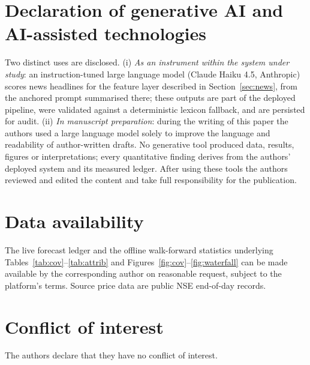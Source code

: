 \documentclass[10pt,a4paper,oneside]{article}
\theoremstyle{definition}
\theoremstyle{plain}
\begin{document}
\section*{Declaration of generative AI and AI-assisted technologies}
Two distinct uses are disclosed. (i) \emph{As an instrument within the system under
study}: an instruction-tuned large language model (Claude Haiku 4.5, Anthropic) scores
news headlines for the feature layer described in Section~\ref{sec:news}, from the
anchored prompt summarised there; these outputs are part of the deployed pipeline,
were validated against a deterministic lexicon fallback, and are persisted for audit.
(ii) \emph{In manuscript preparation}: during the writing of this paper the authors
used a large language model solely to improve the language and readability of
author-written drafts. No generative tool produced data, results, figures or
interpretations; every quantitative finding derives from the authors' deployed system
and its measured ledger. After using these tools the authors reviewed and edited the
content and take full responsibility for the publication.

\section*{Data availability}
The live forecast ledger and the offline walk-forward statistics underlying
Tables~\ref{tab:cov}--\ref{tab:attrib} and Figures~\ref{fig:cov}--\ref{fig:waterfall}
can be made available by the corresponding author on reasonable request, subject to the
platform's terms. Source price data are public NSE end-of-day records.

\section*{Conflict of interest}
The authors declare that they have no conflict of interest.
\end{document}
